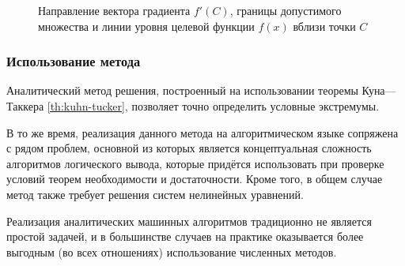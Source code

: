 \begin{itemize}
\begin{figure}[!h]
    \caption[Задача условной оптимизации вблизи одной из стационарных
    точек]{Направление вектора градиента $f'(C)$, границы допустимого
      множества и линии уровня целевой функции $f(x)$ вблизи точки
      $C$}
    \label{fig:cond-optim-zoom}
  \end{figure}
\end{itemize}

\subsubsection{Использование метода}

Аналитический метод решения, построенный на использовании теоремы
Куна—Таккера \ref{th:kuhn-tucker}, позволяет точно определить условные
экстремумы.

В то же время, реализация данного метода на алгоритмическом языке
сопряжена с рядом проблем, основной из которых является концептуальная
сложность алгоритмов логического вывода, которые придётся использовать
при проверке условий теорем необходимости и достаточности. Кроме того,
в общем случае метод также требует решения систем нелинейных
уравнений.

Реализация аналитических машинных алгоритмов традиционно не является
простой задачей, и в большинстве случаев на практике оказывается более
выгодным (во всех отношениях) использование численных методов.
